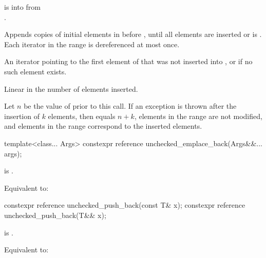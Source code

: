 \begin{itemdescr}
\pnum
\expects
{} is 
into  from\\.

\pnum
\effects
Appends copies of initial elements in  before ,
until all elements are inserted or  is .
Each iterator in the range  is dereferenced at most once.

\pnum
\returns
An iterator pointing to the first element of 
that was not inserted into ,
or  if no such element exists.

\pnum
\complexity
Linear in the number of elements inserted.

\pnum
\remarks
Let $n$ be the value of  prior to this call.
If an exception is thrown after the insertion of $k$ elements, then
 equals $n + k$,
elements in the range  are not modified, and
elements in the range  correspond to
the inserted elements.
\end{itemdescr}

%
\begin{itemdecl}
template<class... Args>
  constexpr reference unchecked_emplace_back(Args&&... args);
\end{itemdecl}

\begin{itemdescr}
\pnum
\expects
{} is .

\pnum
\effects
Equivalent to:
\end{itemdescr}

%
\begin{itemdecl}
constexpr reference unchecked_push_back(const T& x);
constexpr reference unchecked_push_back(T&& x);
\end{itemdecl}

\begin{itemdescr}
\pnum
\expects
{} is .

\pnum
\effects
Equivalent to:
\end{itemdescr}

